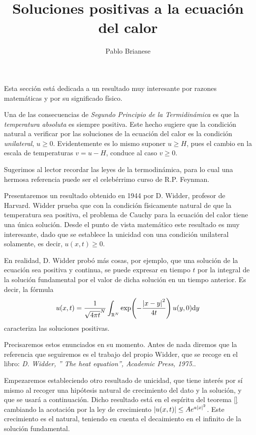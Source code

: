 \documentclass{article}
\title{Soluciones positivas a la ecuación del calor}
\author{Pablo Brianese}
\newcommand{\realNumbers}{\mathbb{R}}
\theoremstyle{definition}
\theoremstyle{remark}
\begin{document}
  \maketitle


  Esta sección está dedicada a un resultado muy interesante por razones matemáticas y por su significado físico.

  Una de las consecuencias de \emph{Segundo Principio de la Termidinámica} es que la \emph{temperatura absoluta} es siempre positiva.
  Este hecho sugiere que la condición natural a verificar por las soluciones de la ecuación del calor es la condición \emph{unilateral}, \(u \geq 0\).
  Evidentemente es lo mismo suponer \(u \geq H\), pues el cambio en la escala de temperaturas \(v = u - H\), conduce al caso \(v \geq 0\).

  Sugerimos al lector recordar las leyes de la termodinámica, para lo cual una hermosa referencia puede ser el celebérrimo curso de R.P. Feynman.

  Presentaremos un resultado obtenido en 1944 por D. Widder, profesor de Harvard.
  Widder prueba que con la condición físicamente natural de que la temperatura sea positiva, el problema de Cauchy para la ecuación del calor tiene una única solución.
  Desde el punto de vista matemático este resultado es muy interesante, dado que se establece la unicidad con una condición unilateral solamente, es decir, \(u(x, t) \geq 0\).

  En realidad, D. Widder probó más cosas, por ejemplo, que una solución de la ecuación sea positiva y continua, se puede expresar en tiempo \(t\) por la integral de la solución fundamental por el valor de dicha solución en un tiempo anterior.
  Es decir, la fórmula
  \begin{align}
    \label{equation:heatEquationRepresentationFormula}
    u(x, t)
    =
    \frac{1}{\sqrt{4 \pi t}^N} \int_{\realNumbers^N} \exp\!\left(- \frac{\abs{x - y}^2}{4 t}\right) u(y, 0) \dd y
  \end{align}
  caracteriza las soluciones positivas.

  Precisaremos estos enunciados en su momento.
  Antes de nada diremos que la referencia que seguiremos es el trabajo del propio Widder, que se recoge en el libro: \textit{D. Widder, ” The heat equation”, Academic Press, 1975.}.

  Empezaremos estableciendo otro resultado de unicidad, que tiene interés por sí mismo al recoger una hipótesis natural de crecimiento del dato y la solución, y que se usará a continuación.
  Dicho resultado está en el espíritu del teorema
  \ref{} %
  cambiando la acotación por la ley de crecimiento \(\abs{u(x, t)} \leq A e^{a \abs{x}^2}\).
  Este crecimiento es el natural, teniendo en cuenta el decaimiento en el infinito de la solución fundamental.
\end{document}

